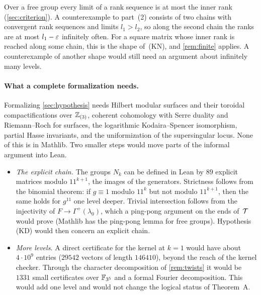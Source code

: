 \begin{remark}\label{rem:shape}
Over a free group every limit of a rank sequence is at most the inner rank (\cref{sec:criterion}). A counterexample to
part~(2) consists of two chains with convergent rank sequences and limits $l_1>l_2$, so along the second chain the ranks
are at most $l_1-\varepsilon$ infinitely often. For a square matrix whose inner rank is reached along some chain, this is the
shape of~(KN), and \cref{rem:finite} applies. A counterexample of another shape would still need an argument about
infinitely many levels.
\end{remark}

\paragraph{What a complete formalization needs.} Formalizing \cref{sec:hypothesis} needs Hilbert modular surfaces and
their toroidal compactifications over $\mathbb{Z}_{(3)}$, coherent cohomology with Serre duality and Riemann--Roch for surfaces,
the logarithmic Kodaira--Spencer isomorphism, partial Hasse invariants, and the uniformization of the supersingular
locus. None of this is in Mathlib. Two smaller steps would move parts of the informal argument into Lean.
\begin{itemize}
\item \emph{The explicit chain.} The groups $N_k$ can be defined in Lean by $89$ explicit matrices modulo $11^{k+1}$, the
images of the generators. Strictness follows from the binomial theorem: if $g\equiv1$ modulo $11^k$ but not modulo
$11^{k+1}$, then the same holds for $g^{11}$ one level deeper. Trivial intersection follows from the injectivity of
$F\to\Gamma^+(\lambda_0)$, which a ping-pong argument on the ends of~$\mathcal{T}$ would prove (Mathlib has the ping-pong lemma
for free groups). Hypothesis (KD) would then concern an explicit chain.
\item \emph{More levels.} A direct certificate for the kernel at $k=1$ would have about $4\cdot10^9$ entries ($29542$
vectors of length $146410$), beyond the reach of the kernel checker. Through the character decomposition of
\cref{rem:twists} it would be $1331$ small certificates over $\mathbb{F}_{3^5}$ and a formal Fourier decomposition. This would
add one level and would not change the logical status of Theorem~A.
\end{itemize}
